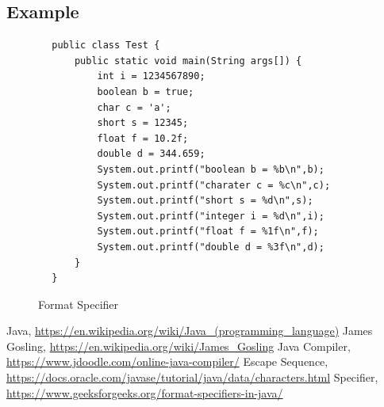 \documentclass[A4 paper,openany]{book}  %
\begin{document}
\subsection{Example}
\begin{center}
    \begin{verbatim}
        public class Test {
            public static void main(String args[]) {
                int i = 1234567890;
                boolean b = true;
                char c = 'a';
                short s = 12345;
                float f = 10.2f;
                double d = 344.659;
                System.out.printf("boolean b = %b\n",b);
                System.out.printf("charater c = %c\n",c);
                System.out.printf("short s = %d\n",s);
                System.out.printf("integer i = %d\n",i);
                System.out.printf("float f = %1f\n",f);
                System.out.printf("double d = %3f\n",d);
            }
        }
    \end{verbatim}
\end{center}
% 
% 
\begin{figure}[htbp]
    \begin{center}
        \caption{Format Specifier\cite{Ref5}\cite{Ref3}}
    \end{center}
\end{figure}

















% 
% 
\printindex
% 
% 
\begin{thebibliography}{90}
     Java, \url{https://en.wikipedia.org/wiki/Java_(programming_language)}
     James Gosling, \url{https://en.wikipedia.org/wiki/James_Gosling}
     Java Compiler, \url{https://www.jdoodle.com/online-java-compiler/}
     Escape Sequence, \url{https://docs.oracle.com/javase/tutorial/java/data/characters.html}
     Specifier, \url{https://www.geeksforgeeks.org/format-specifiers-in-java/}
\end{thebibliography}
\end{document}
